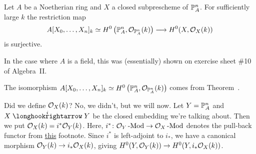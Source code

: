 \documentclass[a4paper,parskip=half,numbers=enddot, DIV=12]{scrreprt}
\begin{document}
\begin{prop}
	Let $A$ be a Noetherian ring and $X$ a closed subprescheme of $\mathbb{P}_A^n$. For sufficiently large $k$ the restriction map
	\begin{align*}
		A[X_0,\ldots,X_n]_k\simeq H^0\left(\IP_A^n,\Oo_{\IP_A^n}(k)\right)\morphism H^0(X,\Oo_X(k))
	\end{align*}
	is surjective.
\end{prop}
\begin{rem}
	\begin{alphanumerate}
		\item {}In the case where $A$ is a field, this was (essentially) shown on exercise sheet \#10 of Algebra~II.
		\item The isomorphism $A[X_0,\ldots,X_n]_k\simeq H^0\left(\mathbb{P}_A^n,\mathcal{O}_{\mathbb{P}_A^n}(k)\right)$ comes from Theorem~.
		\item Did we define $\mathcal{O}_X(k)$? No, we didn't, but we will now. Let $Y=\mathbb{P}_A^n$ and $X\monomorphism[i]Y$ be the closed embedding we're talking about. Then we put $\mathcal{O}_X(k)=i^*\mathcal{O}_Y(k)$. Here, $i^*\colon \Oo_Y\cat{-Mod}\morphism\Oo_X\cat{-Mod}$ denotes the pull-back functor from \hyperref[footnote:f^*]{this} footnote. Since $i^*$ is left-adjoint to $i_*$, we have a canonical morphism $\Oo_Y(k)\morphism i_*\Oo_X(k)$, giving $H^0(Y,\Oo_Y(k))\morphism H^0(Y,i_*\Oo_X(k))$. 
		

\end{alphanumerate}
\end{rem}
\end{document}
